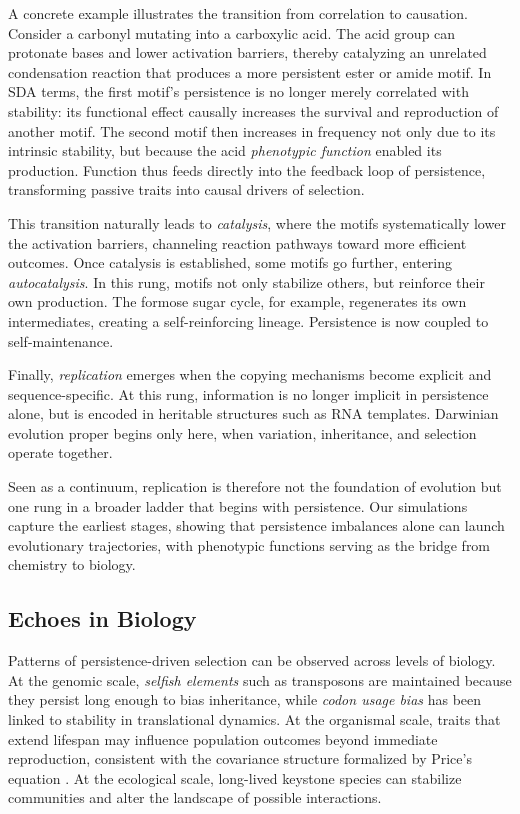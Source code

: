 \documentclass[life,article,submit,pdftex,moreauthors]{Definitions/mdpi}
\begin{document}
A concrete example illustrates the transition from correlation to causation. Consider a carbonyl mutating into a carboxylic acid. The acid group can protonate bases and lower activation barriers, thereby catalyzing an unrelated condensation reaction that produces a more persistent ester or amide motif. In SDA terms, the first motif’s persistence is no longer merely correlated with stability: its functional effect causally increases the survival and reproduction of another motif. The second motif then increases in frequency not only due to its intrinsic stability, but because the acid \emph{phenotypic function} enabled its production. Function thus feeds directly into the feedback loop of persistence, transforming passive traits into causal drivers of selection.  

This transition naturally leads to \emph{catalysis}, where the motifs systematically lower the activation barriers, channeling reaction pathways toward more efficient outcomes. Once catalysis is established, some motifs go further, entering \emph{autocatalysis}. In this rung, motifs not only stabilize others, but reinforce their own production. The formose sugar cycle, for example, regenerates its own intermediates, creating a self-reinforcing lineage. Persistence is now coupled to self-maintenance.  

Finally, \emph{replication} \cite{england2013statphys} emerges when the copying mechanisms become explicit and sequence-specific. At this rung, information is no longer implicit in persistence alone, but is encoded in heritable structures such as RNA templates. Darwinian evolution proper begins only here, when variation, inheritance, and selection operate together.  

Seen as a continuum, replication is therefore not the foundation of evolution but one rung in a broader ladder that begins with persistence. Our simulations capture the earliest stages, showing that persistence imbalances alone can launch evolutionary trajectories, with phenotypic functions serving as the bridge from chemistry to biology.


\subsection{Echoes in Biology}

Patterns of persistence-driven selection can be observed across levels of biology.  
At the genomic scale, \textit{selfish elements} such as transposons are maintained because they persist long enough to bias inheritance, while \textit{codon usage bias} has been linked to stability in translational dynamics.  
At the organismal scale, traits that extend lifespan may influence population outcomes beyond immediate reproduction, consistent with the covariance structure formalized by Price’s equation \cite{price1970}.  
At the ecological scale, long-lived keystone species can stabilize communities and alter the landscape of possible interactions.  
\end{document}
